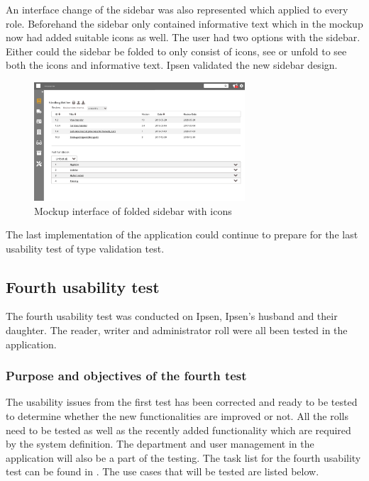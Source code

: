 An interface change of the sidebar was also represented which applied to every role.
Beforehand the sidebar only contained informative text which in the mockup now had added suitable icons as well. 
The user had two options with the sidebar.
Either could the sidebar be folded to only consist of icons, see  or unfold to see both the icons and informative text. 
Ipsen validated the new sidebar design. 

\begin{figure}[H]
	\centering
		\includegraphics[width=0.7\textwidth]{billeder/ForsideFoldedSidebar.jpg}
	\caption{Mockup interface of folded sidebar with icons}\label{fig:mockupSidebarIcon}
\end{figure}

The last implementation of the application could continue to prepare for the last usability test of type validation test. 

\subsection{Fourth usability test}\label{fourthtest}
The fourth usability test was conducted on Ipsen, Ipsen's husband and their daughter. 
The reader, writer and administrator roll were all been tested in the application. 

\subsubsection*{Purpose and objectives of the fourth test}
The usability issues from the first test has been corrected and ready to be tested to determine whether the new functionalities are improved or not. 
All the rolls need to be tested as well as the recently added functionality which are required by the system definition. 
The department and user management in the application will also be a part of the testing. The task list for the fourth usability test can be found in .
The use cases that will be tested are listed below.

